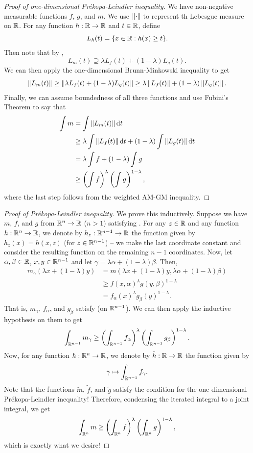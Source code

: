 \begin{proof}[Proof of one-dimensional Pr\'{e}kopa-Leindler inequality]
We have non-negative measurable functions $f$, $g$, and $m$. We use $\left\lVert\cdot\right\rVert$ to represent th Lebesgue measure on $\mathbb{R}$. For any function $h:\mathbb{R}\to\mathbb{R}$ and $t\in\mathbb{R}$, define
\[ L_h(t) = \{x\in\mathbb{R}: h(x)\geq t\}. \]
Then note that by ,
\[ L_m(t) \supseteq \lambda L_f(t) + (1-\lambda)L_g(t). \]
We can then apply the one-dimensional Brunn-Minkowski inequality to get
\[ \left\lVert L_m(t)\right\rVert \geq \left\lVert\lambda L_f(t) + (1-\lambda)L_g(t)\right\rVert \geq \lambda \left\lVert L_f(t)\right\rVert + (1-\lambda)\left\lVert L_g(t)\right\rVert. \]
Finally, we can assume boundedness of all three functions and use Fubini's Theorem to say that
\begin{align*}
    \int m  &= \int \left\lVert L_m(t)\right\rVert\operatorname{d}\!{t} \\
    &\geq \lambda \int \left\lVert L_f(t)\right\rVert\operatorname{d}\!{t} + (1-\lambda) \int \left\lVert L_g(t)\right\rVert\operatorname{d}\!{t} \\
    &= \lambda \int f + (1-\lambda) \int g \\
    &\geq \left(\int f\right)^{\lambda}\left(\int g\right)^{1-\lambda},
\end{align*}
where the last step follows from the weighted AM-GM inequality.
\end{proof}

\begin{proof}[Proof of Pr\'{e}kopa-Leindler inequality]
We prove this inductively. Suppose we have $m$, $f$, and $g$ from $\mathbb{R}^n\to\mathbb{R}$ ($n>1$) satisfying . For any $z\in\mathbb{R}$ and any function $h:\mathbb{R}^n\to \mathbb{R}$, we denote by $h_z:\mathbb{R}^{n-1}\to\mathbb{R}$ the function given by $h_z(x)=h(x,z)$ (for $z\in\mathbb{R}^{n-1}$) -- we make the last coordinate constant and consider the resulting function on the remaining $n-1$ coordinates. Now, let $\alpha,\beta\in\mathbb{R}$, $x,y\in\mathbb{R}^{n-1}$ and let $\gamma = \lambda\alpha + (1-\lambda)\beta$. Then,
\begin{align*}
    m_\gamma(\lambda x + (1-\lambda)y) &= m(\lambda x + (1-\lambda)y, \lambda\alpha + (1-\lambda)\beta) \\
    &\geq f(x,\alpha)^\lambda g(y,\beta)^{1-\lambda} \\
    &= f_\alpha(x)^\lambda g_\beta(y)^{1-\lambda}.
\end{align*}
That is, $m_\gamma$, $f_\alpha$, and $g_\beta$ satisfy  (on $\mathbb{R}^{n-1}$). We can then apply the inductive hypothesis on them to get
\[ \int_{\mathbb{R}^{n-1}} m_\gamma \geq \left(\int_{\mathbb{R}^{n-1}}f_\alpha\right)^\lambda \left(\int_{\mathbb{R}^{n-1}}g_\beta\right)^{1-\lambda}. \]
Now, for any function $h:\mathbb{R}^n\to\mathbb{R}$, we denote by $\tilde{h}:\mathbb{R}\to\mathbb{R}$ the function given by
\[ \gamma \mapsto \int_{\mathbb{R}^{n-1}} f_\gamma. \]
Note that the functions $\tilde{m}$, $\tilde{f}$, and $\tilde{g}$ satisfy the condition for the one-dimensional Pr\'{e}kopa-Leindler inequality! Therefore, condensing the iterated integral to a joint integral, we get
\[ \int_{\mathbb{R}^n} m \geq \left(\int_{\mathbb{R}^n} f\right)^{\lambda}\left(\int_{\mathbb{R}^n} g\right)^{1-\lambda}, \]
which is exactly what we desire!
\end{proof}

